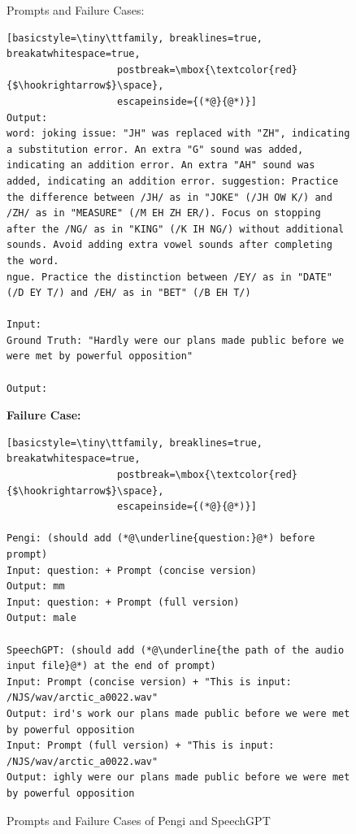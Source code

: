 \documentclass[11pt]{article}
\begin{document}
\begin{figure}[ht]
\begin{AIBox}{Prompts and Failure Cases:}
\begin{minipage}[t]{\textwidth}
\begin{lstlisting}[basicstyle=\tiny\ttfamily, breaklines=true, breakatwhitespace=true,
                   postbreak=\mbox{\textcolor{red}{$\hookrightarrow$}\space},
                   escapeinside={(*@}{@*)}]
Output:
word: joking issue: "JH" was replaced with "ZH", indicating a substitution error. An extra "G" sound was added, indicating an addition error. An extra "AH" sound was added, indicating an addition error. suggestion: Practice the difference between /JH/ as in "JOKE" (/JH OW K/) and /ZH/ as in "MEASURE" (/M EH ZH ER/). Focus on stopping after the /NG/ as in "KING" (/K IH NG/) without additional sounds. Avoid adding extra vowel sounds after completing the word.
ngue. Practice the distinction between /EY/ as in "DATE" (/D EY T/) and /EH/ as in "BET" (/B EH T/)
    
Input:
Ground Truth: "Hardly were our plans made public before we were met by powerful opposition"

Output:
\end{lstlisting}
\end{minipage}

\tcbline

\begin{minipage}[t]{\textwidth}
{\bf Failure Case:} \scriptsize
\begin{lstlisting}[basicstyle=\tiny\ttfamily, breaklines=true, breakatwhitespace=true,
                   postbreak=\mbox{\textcolor{red}{$\hookrightarrow$}\space},
                   escapeinside={(*@}{@*)}]

Pengi: (should add (*@\underline{question:}@*) before prompt)
Input: question: + Prompt (concise version)
Output: mm
Input: question: + Prompt (full version)
Output: male

SpeechGPT: (should add (*@\underline{the path of the audio input file}@*) at the end of prompt)
Input: Prompt (concise version) + "This is input: /NJS/wav/arctic_a0022.wav"
Output: ird's work our plans made public before we were met by powerful opposition
Input: Prompt (full version) + "This is input: /NJS/wav/arctic_a0022.wav"
Output: ighly were our plans made public before we were met by powerful opposition

\end{lstlisting}
\end{minipage}

\end{AIBox}
\caption{Prompts and Failure Cases of Pengi and SpeechGPT}
\label{fig:failure_cases}
\end{figure}
\end{document}
